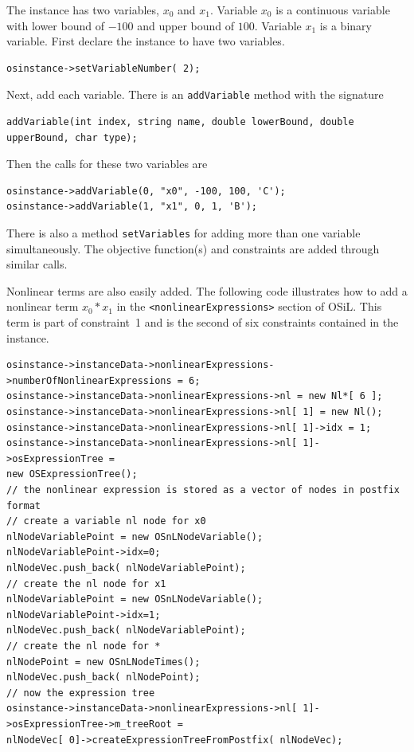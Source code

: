 \documentclass[11pt]{article}
\renewcommand{\_}{{\char"5F}}
\renewcommand{\{}{{\char"7B}}
\renewcommand{\}}{{\char"7D}}
\renewcommand{\^}{{\char"0D}}
\renewcommand{\'}{{\char"0D}}
\begin{document}
\begin{enumerate}[Step 1:]
The instance has two variables, $x_{0}$ and $x_{1}$. Variable $x_{0}$ is a continuous variable with lower bound of $-100$ and upper bound of $100$. Variable $x_{1}$ is a binary variable. First declare the instance to have two variables.
\begin{verbatim}
osinstance->setVariableNumber( 2);
\end{verbatim}
Next, add each variable. There is an {\tt addVariable} method with the signature
\begin{verbatim}
addVariable(int index, string name, double lowerBound, double upperBound, char type);
\end{verbatim}
Then the calls for these two variables are
\begin{verbatim}
osinstance->addVariable(0, "x0", -100, 100, 'C');
osinstance->addVariable(1, "x1", 0, 1, 'B');
\end{verbatim}
There is also a method {\tt setVariables} for adding more than one variable simultaneously.  The objective function(s) and constraints are added through similar calls.

Nonlinear terms are also easily added.  The following code illustrates how to add a nonlinear term
$x_{0}*x_{1}$ in the {\tt <nonlinearExpressions>} section of  OSiL. This term is part of constraint~1
and is the second of six constraints contained in the instance.
\begin{verbatim}
osinstance->instanceData->nonlinearExpressions->numberOfNonlinearExpressions = 6;
osinstance->instanceData->nonlinearExpressions->nl = new Nl*[ 6 ];
osinstance->instanceData->nonlinearExpressions->nl[ 1] = new Nl();
osinstance->instanceData->nonlinearExpressions->nl[ 1]->idx = 1;
osinstance->instanceData->nonlinearExpressions->nl[ 1]->osExpressionTree =
new OSExpressionTree();
// the nonlinear expression is stored as a vector of nodes in postfix format
// create a variable nl node for x0
nlNodeVariablePoint = new OSnLNodeVariable();
nlNodeVariablePoint->idx=0;
nlNodeVec.push_back( nlNodeVariablePoint);
// create the nl node for x1
nlNodeVariablePoint = new OSnLNodeVariable();
nlNodeVariablePoint->idx=1;
nlNodeVec.push_back( nlNodeVariablePoint);
// create the nl node for *
nlNodePoint = new OSnLNodeTimes();
nlNodeVec.push_back( nlNodePoint);
// now the expression tree
osinstance->instanceData->nonlinearExpressions->nl[ 1]->osExpressionTree->m_treeRoot =
nlNodeVec[ 0]->createExpressionTreeFromPostfix( nlNodeVec);
\end{verbatim}


\end{enumerate}
\end{document}
